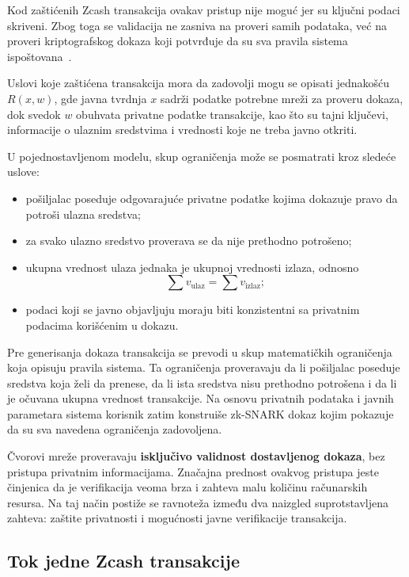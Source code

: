 Kod zaštićenih Zcash transakcija ovakav pristup nije moguć jer su ključni podaci skriveni. Zbog toga se validacija ne zasniva na proveri samih podataka, već na proveri kriptografskog dokaza koji potvrđuje da su sva pravila sistema ispoštovana~\cite{ganesh2020demystifying}.

Uslovi koje zaštićena transakcija mora da zadovolji mogu se opisati jednakošću \(R(x,w)\), gde javna tvrdnja \(x\) sadrži podatke potrebne mreži za proveru dokaza, dok svedok \(w\) obuhvata privatne podatke transakcije, kao što su tajni ključevi, informacije o ulaznim sredstvima i vrednosti koje ne treba javno otkriti.

U pojednostavljenom modelu, skup ograničenja može se posmatrati kroz sledeće uslove:

\begin{itemize}
    \item pošiljalac poseduje odgovarajuće privatne podatke kojima dokazuje pravo da potroši ulazna sredstva;
    \item za svako ulazno sredstvo proverava se da nije prethodno potrošeno;
    \item ukupna vrednost ulaza jednaka je ukupnoj vrednosti izlaza, odnosno
    \[
    \sum v_{\text{ulaz}} = \sum v_{\text{izlaz}};
    \]
    \item podaci koji se javno objavljuju moraju biti konzistentni sa privatnim podacima korišćenim u dokazu.
\end{itemize}

Pre generisanja dokaza transakcija se prevodi u skup matematičkih ograničenja koja opisuju pravila sistema. Ta ograničenja proveravaju da li pošiljalac poseduje sredstva koja želi da prenese, da li ista sredstva nisu prethodno potrošena i da li je očuvana ukupna vrednost transakcije. Na osnovu privatnih podataka i javnih parametara sistema korisnik zatim konstruiše zk-SNARK dokaz kojim pokazuje da su sva navedena ograničenja zadovoljena.

Čvorovi mreže proveravaju \textbf{isključivo validnost dostavljenog dokaza}, bez pristupa privatnim informacijama. Značajna prednost ovakvog pristupa jeste činjenica da je verifikacija veoma brza i zahteva malu količinu računarskih resursa. Na taj način postiže se ravnoteža između dva naizgled suprotstavljena zahteva: zaštite privatnosti i mogućnosti javne verifikacije transakcija.

\subsection{Tok jedne Zcash transakcije}

